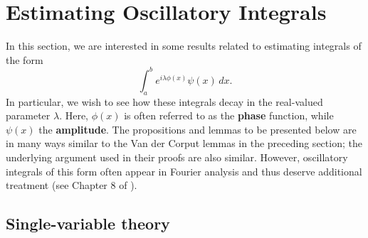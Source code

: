 \documentclass[11pt, letter]{book}
\begin{document}
\section{Estimating Oscillatory Integrals}\label{sec:Estimate_OscInt}
In this section, we are interested in some results related to estimating integrals of the form 
\begin{equation*}
    \int^b_a e^{i\lambda \phi(x)}\psi(x)\,dx.
\end{equation*}
In particular, we wish to see how these integrals decay in the real-valued parameter $\lambda$. Here, $\phi(x)$ is often referred to as the {\textbf{phase}} function, while $\psi(x)$ the \textbf{amplitude}. The propositions and lemmas to be presented below are in many ways similar to the Van der Corput lemmas in the preceding section; the underlying argument used in their proofs are also similar. However, oscillatory integrals of this form often appear in Fourier analysis and thus deserve additional treatment (see Chapter 8 of \cite{SteinFunctionalAnalysis}). 


\subsection{Single-variable theory}
\end{document}

